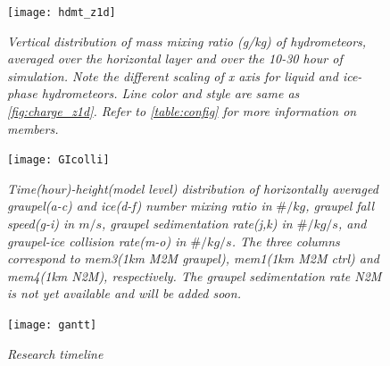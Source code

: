 \begin{figure}[H]
\centering
\vspace{-10pt}
\texttt{[image: hdmt\_z1d]}
\singlespacing
\vspace{-20pt}
\caption{\textit{Vertical distribution of mass mixing ratio (g/kg) of hydrometeors, averaged over the horizontal layer and over the 10-30 hour of simulation. Note the different scaling of x axis for liquid and ice-phase hydrometeors. Line color and style are same as \ref{fig:charge_z1d}. Refer to \ref{table:config} for more information on members.}}
\label{fig:hdmt_z1d}
\end{figure}


\begin{figure}[H]
\centering
\vspace{-10pt}
\texttt{[image: GIcolli]}
\singlespacing
\vspace{-20pt}
\caption{\textit{Time(hour)-height(model level) distribution of horizontally averaged graupel(a-c) and ice(d-f) number mixing ratio in $\#/kg$, graupel fall speed(g-i) in $m/s$, graupel sedimentation rate(j,k) in $\#/kg/s$, and graupel-ice collision rate(m-o) in $\#/kg/s$. The three columns correspond to mem3(1km M2M graupel), mem1(1km M2M ctrl) and mem4(1km N2M), respectively. The graupel sedimentation rate N2M is not yet available and will be added soon.}}
\label{fig:GIcolli}
\end{figure}

\begin{figure}[H]
\centering
\vspace{-10pt}
\texttt{[image: gantt]}
\singlespacing
\vspace{-20pt}
\caption{\textit{Research timeline}}
\label{fig:gantt}
\end{figure}